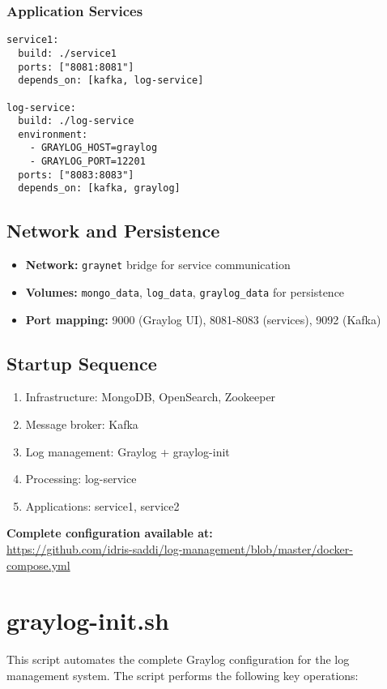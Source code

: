 \documentclass[12pt,a4paper]{report}
\begin{document}
\subsection*{Application Services}
\begin{Verbatim}[frame=single, fontsize=\scriptsize]
service1:
  build: ./service1
  ports: ["8081:8081"]
  depends_on: [kafka, log-service]

log-service:
  build: ./log-service
  environment:
    - GRAYLOG_HOST=graylog
    - GRAYLOG_PORT=12201
  ports: ["8083:8083"]
  depends_on: [kafka, graylog]
\end{Verbatim}

\section*{Network and Persistence}
\begin{itemize}
\item \textbf{Network:} \texttt{graynet} bridge for service communication
\item \textbf{Volumes:} \texttt{mongo\_data}, \texttt{log\_data}, \texttt{graylog\_data} for persistence
\item \textbf{Port mapping:} 9000 (Graylog UI), 8081-8083 (services), 9092 (Kafka)
\end{itemize}

\section*{Startup Sequence}
\begin{enumerate}
\item Infrastructure: MongoDB, OpenSearch, Zookeeper
\item Message broker: Kafka
\item Log management: Graylog + graylog-init
\item Processing: log-service
\item Applications: service1, service2
\end{enumerate}

\textbf{Complete configuration available at:} \\
\url{https://github.com/idris-saddi/log-management/blob/master/docker-compose.yml}

\chapter{graylog-init.sh}

This script automates the complete Graylog configuration for the log management system. The script performs the following key operations:
\end{document}
